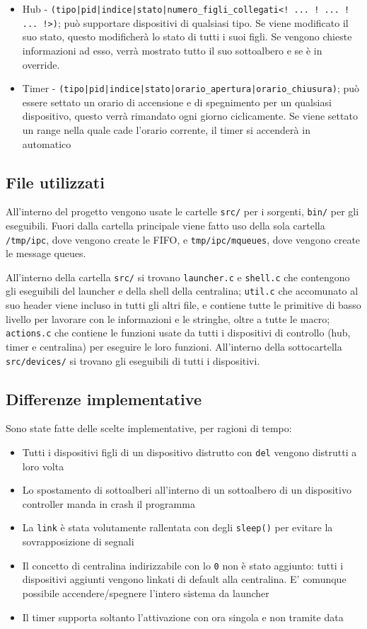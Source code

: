 \documentclass[11pt]{article}
\begin{document}
\begin{itemize}
    \item Hub - \verb=(tipo|pid|indice=\verb=|stato|numero_figli_collegati=\verb=<! ... ! ... ! ... !>)=; può supportare dispositivi di qualsiasi tipo. Se viene modificato il suo stato, questo modificherà lo stato di tutti i suoi figli. Se vengono chieste informazioni ad esso, verrà mostrato tutto il suo sottoalbero e se è in override.
    \item Timer - \verb=(tipo|pid|indice=\verb=|stato|orario_apertura=\verb=|orario_chiusura)=; può essere settato un orario di accensione e di spegnimento per un qualsiasi dispositivo, questo verrà rimandato ogni giorno ciclicamente. Se viene settato un range nella quale cade l'orario corrente, il timer si accenderà in automatico
\end{itemize}

\subsection{File utilizzati}
All'interno del progetto vengono usate le cartelle \verb|src/| per i sorgenti, \verb|bin/| per gli eseguibili. Fuori dalla cartella principale viene fatto uso della sola cartella \verb|/tmp/ipc|, dove vengono create le FIFO, e \verb|tmp/ipc/mqueues|, dove vengono create le message queues.

All'interno della cartella \verb|src/| si trovano \verb|launcher.c| e \verb|shell.c| che contengono gli eseguibili del launcher e della shell della centralina; \verb|util.c| che accomunato al suo header viene incluso in tutti gli altri file, e contiene tutte le primitive di basso livello per lavorare con le informazioni e le stringhe, oltre a tutte le macro; \verb|actions.c| che contiene le funzioni usate da tutti i dispositivi di controllo (hub, timer e centralina) per eseguire le loro funzioni. All'interno della sottocartella \verb|src/devices/| si trovano gli eseguibili di tutti i dispositivi.

\subsection{Differenze implementative}

Sono state fatte delle scelte implementative, per ragioni di tempo:
\begin{itemize}
    \item Tutti i dispositivi figli di un dispositivo distrutto con \verb|del| vengono distrutti a loro volta
    \item Lo spostamento di sottoalberi all'interno di un sottoalbero di un dispositivo controller manda in crash il programma
    \item La \verb|link| è stata volutamente rallentata con degli \verb|sleep()| per evitare la sovrapposizione di segnali
    \item Il concetto di centralina indirizzabile con lo \verb|0| non è stato aggiunto: tutti i dispositivi aggiunti vengono linkati di default alla centralina. E' comunque possibile accendere/spegnere l'intero sistema da launcher
    \item Il timer supporta soltanto l'attivazione con ora singola e non tramite data
\end{itemize}
\end{document}
